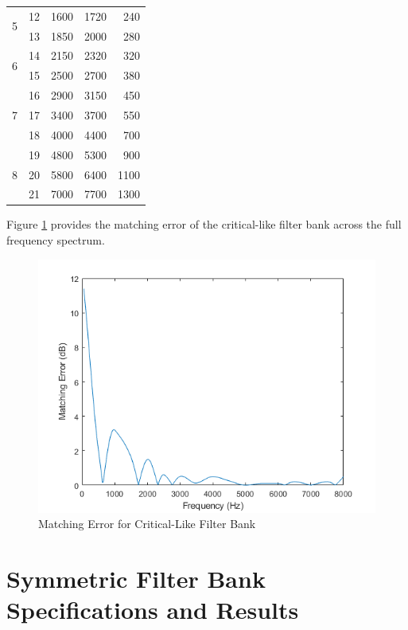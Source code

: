 \documentclass[11pt,onecolumn]{witseiepaper}
\begin{document}
\begin{appendices}
\begin{table}[htbp]
\begin{adjustbox}{width=0.9\linewidth}
\begin{tabular}{|c|r|r|r|r|}
    \hline
    \multirow{2}[4]{*}{5} & 12    & 1600  & 1720  & 240 \\
\cline{2-5}          & 13    & 1850  & 2000  & 280 \\
    \hline
    \multirow{2}[4]{*}{6} & 14    & 2150  & 2320  & 320 \\
\cline{2-5}          & 15    & 2500  & 2700  & 380 \\
    \hline
    \multirow{3}[6]{*}{7} & 16    & 2900  & 3150  & 450 \\
\cline{2-5}          & 17    & 3400  & 3700  & 550 \\
\cline{2-5}          & 18    & 4000  & 4400  & 700 \\
    \hline
    \multirow{3}[6]{*}{8} & 19    & 4800  & 5300  & 900 \\
\cline{2-5}          & 20    & 5800  & 6400  & 1100 \\
\cline{2-5}          & 21    & 7000  & 7700  & 1300 \\
    \hline
    \end{tabular}%
    \end{adjustbox}
  \label{tab:critFiltFreqBand}%
\end{table}%

\noindent Figure \ref{fig:critMatErr} provides the matching error of the critical-like filter bank across the full frequency spectrum.

\begin{figure}[h]
\centering
\includegraphics[width=0.6\linewidth]{critMatErr.PNG}
\caption{Matching Error for Critical-Like Filter Bank}
\label{fig:critMatErr}
\end{figure}  

\section{Symmetric Filter Bank Specifications and Results} 
\label{app:symFreqBands}


\end{appendices}
\end{document}
